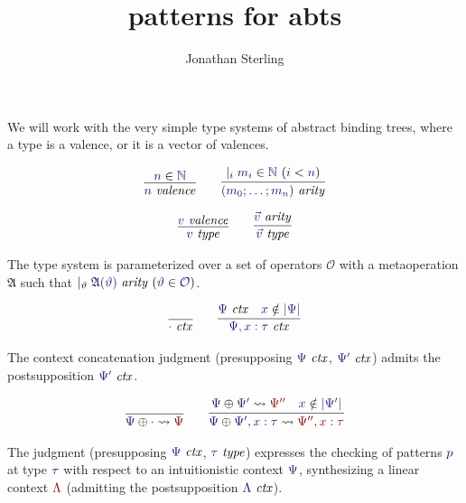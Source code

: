 \documentclass[11pt]{amsart}
\theoremstyle{definition}
\theoremstyle{remark}
\numberwithin{equation}{section}
\def\InputModeColorName{MidnightBlue}
\def\OutputModeColorName{Maroon}
\newcommand\InputMode[1]{{\color{\InputModeColorName}{#1}}}
\newcommand\OutputMode[1]{{\color{\OutputModeColorName}{#1}}}
\newcommand\HypJ[2]{#1\ (#2)}
\newcommand\GenJ[2]{\vert_{#1}\; #2}
\newcommand\Member[2]{\InputMode{#1}\in \InputMode{#2}}
\newcommand\NotMember[2]{\InputMode{#1}\notin \InputMode{#2}}
\newcommand\Nat{\mathbb{N}}
\newcommand\IsType[1]{\InputMode{#1}\ \mathit{type}}
\newcommand\IsValence[1]{\InputMode{#1}\ \mathit{valence}}
\newcommand\IsArity[1]{\InputMode{#1}\ \mathit{arity}}
\newcommand\IsCtx[1]{\InputMode{#1}\ \mathit{ctx}}
\newcommand\CtxAppend[3]{\InputMode{#1}\oplus\InputMode{#2}\leadsto\OutputMode{#3}}
\newcommand\Dom[1]{|#1|}
\newcommand\OPS{\mathcal{O}}
\newcommand\Arity{\mathfrak{A}}
\newcommand\ChkPat[4]{\InputMode{#1}\mid\OutputMode{#4}\Vdash\InputMode{#2}:\InputMode{#3}}
\newcommand\jframe[1]{\framebox{\ensuremath{#1}}}
\begin{document}
\title{patterns for abts}

\author{Jonathan Sterling}
\address{}

\onehalfspacing

\maketitle

We will work with the very simple type systems of abstract binding trees, where
a type is a valence, or it is a vector of valences.

\begin{gather*}
  \infer{
    \IsValence{n}
  }{
    \Member{n}{\Nat}
  }
  \qquad
  \infer{
    \IsArity{(m_0;\dots;m_n)}
  }{
    \GenJ{i}{\HypJ{\Member{m_i}{\Nat}}{\InputMode{i} < \InputMode{n}}}
  }\\[6pt]
  \infer{
    \IsType{v}
  }{
    \IsValence{v}
  }
  \qquad
  \infer{
    \IsType{\vec{v}}
  }{
    \IsArity{\vec{v}}
  }
\end{gather*}

The type system is parameterized over a set of operators $\OPS$ with a
metaoperation $\Arity$ such that $\GenJ{\vartheta}{\HypJ{\IsArity{\Arity(\vartheta)}}{\Member{\vartheta}{\OPS}}}$.

\begin{gather*}
  \infer{
    \IsCtx{\cdot}
  }{
  }
  \qquad
  \infer{
    \IsCtx{\Psi, x:\tau}
  }{
    \IsCtx{\Psi} &
    \NotMember{x}{\Dom\Psi}
  }
\end{gather*}

The context concatenation judgment \jframe{\CtxAppend{\Psi}{\Psi'}{\Psi''}}
(presupposing $\IsCtx{\Psi}$, $\IsCtx{\Psi'}$) admits the postsupposition
$\IsCtx{\Psi'}$.

\begin{gather*}
  \infer{
    \CtxAppend{\Psi}{\cdot}{\Psi}
  }{
  }
  \qquad
  \infer{
    \CtxAppend{\Psi}{\Psi',x:\tau}{\Psi'',x:\tau}
  }{
    \CtxAppend{\Psi}{\Psi'}{\Psi''} &
    \NotMember{x}{\Dom{\Psi'}}
  }
\end{gather*}

The judgment \jframe{\ChkPat{\Psi}{p}{\tau}{\Lambda}} (presupposing
$\IsCtx{\Psi}$, $\IsType{\tau}$) expresses the checking of patterns
$\InputMode{p}$ at type $\InputMode{\tau}$ with respect to an intuitionistic
context $\InputMode{\Psi}$, synthesizing a linear context
$\OutputMode{\Lambda}$ (admitting the postsupposition $\IsCtx{\Lambda}$).
\end{document}

